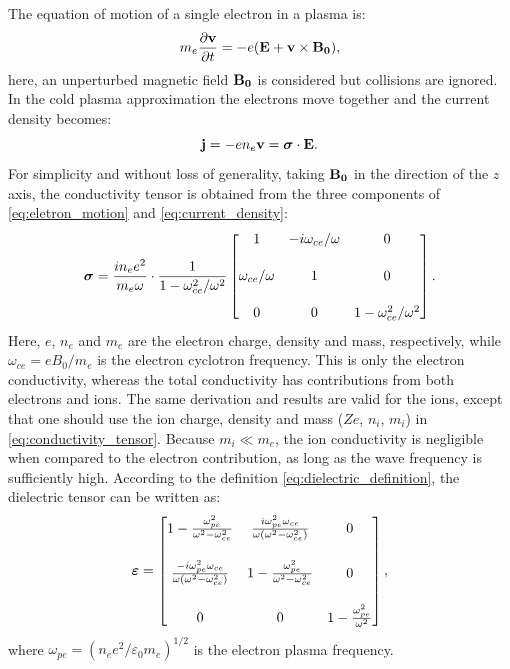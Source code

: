 The equation of motion of a single electron in a plasma is:%
\begin{equation}\label{eq:eletron_motion}
   m_e\frac{\partial \boldsymbol{\mathrm{v}}}{\partial t} = -e(\boldsymbol{\mathrm{E}}+\boldsymbol{\mathrm{v}}\times\boldsymbol{\mathrm{B_0}}),
\end{equation}
\noindent here, an unperturbed magnetic field $\boldsymbol{\mathrm{B_0}}$ is considered but collisions are ignored. In the cold plasma approximation the electrons move together and the current density becomes:%
\begin{equation}\label{eq:current_density}
  \boldsymbol{\mathrm{j}}=-en_e\boldsymbol{\mathrm{v}}=\boldsymbol{\mathrm{\sigma}} \cdot \boldsymbol{\mathrm{E}}.
\end{equation}
\noindent For simplicity and without loss of generality, taking $\boldsymbol{\mathrm{B_0}}$ in the direction of the $z$ axis, the conductivity tensor is obtained from the three components of \eqref{eq:eletron_motion} and \eqref{eq:current_density}:%
\begin{equation}\label{eq:conductivity_tensor}
  \bu{\sigma} = \frac{in_ee^2}{m_e\omega} \cdot \frac{1}{1-\omega_{ce}^2/\omega^2}
\begin{bmatrix}
\vspace{0.5cm}
1 & -i\omega_{ce}/\omega & 0 \\
\vspace{0.5cm}
\omega_{ce}/\omega & 1 & 0 \\
0 & 0 & 1-\omega_{ce}^2/\omega^2
\end{bmatrix}.
\end{equation}
\noindent Here, $e$, $n_e$ and $m_e$ are the electron charge, density and mass, respectively, while $\omega_{ce}=eB_0/m_e$ is the electron cyclotron frequency. This is only the electron conductivity, whereas the total conductivity has contributions from both electrons and ions. The same derivation and results are valid for the ions, except that one should use the ion charge, density and mass ($Ze$, $n_i$, $m_i$) in \eqref{eq:conductivity_tensor}. Because $m_i \ll m_e$, the ion conductivity is negligible when compared to the electron contribution, as long as the wave frequency is sufficiently high. According to the definition \eqref{eq:dielectric_definition}, the dielectric tensor can be written as:%
\begin{equation}\label{eq:dielectric_tensor}
\bu{\epsilon} =
\begin{bmatrix}
\vspace{0.5cm}
1-\frac{\omega_{pe}^2}{\omega^2-\omega_{ce}^2} & \frac{i\omega_{pe}^2\omega_{ce}}{\omega(\omega^2-\omega_{ce}^2)} & 0 \\
\vspace{0.5cm}
\frac{-i\omega_{pe}^2\omega_{ce}}{\omega(\omega^2-\omega_{ce}^2)} & 1-\frac{\omega_{pe}^2}{\omega^2-\omega_{ce}^2} & 0 \\
0 & 0 & 1-\frac{\omega_{pe}^2}{\omega^2}
\end{bmatrix},
\end{equation}
\noindent where $\omega_{pe}=(n_ee^2/\varepsilon_0m_e)^{1/2}$ is the electron plasma frequency.

